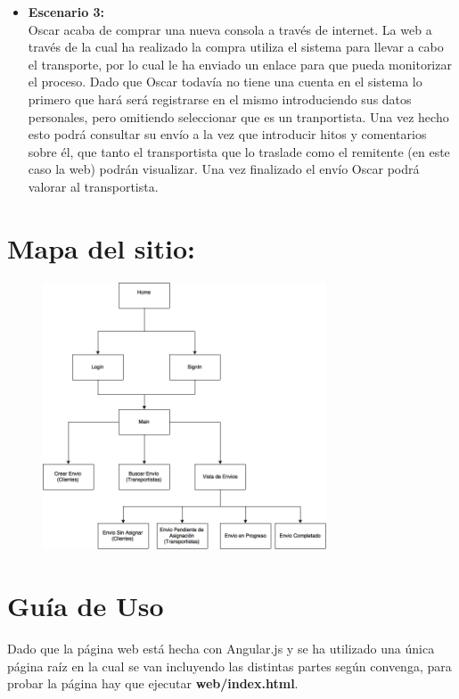 \documentclass[10pt, a4paper,spanish]{article}
\begin{document}
\begin{itemize}
			\item \textbf{Escenario 3:} \\
				Oscar acaba de comprar una nueva consola a través de internet. La web a través de la cual ha realizado la compra utiliza el sistema para llevar a cabo el transporte, por lo cual le ha enviado un enlace para que pueda monitorizar el proceso. Dado que Oscar todavía no tiene una cuenta en el sistema lo primero que hará será registrarse en el mismo introduciendo sus datos personales, pero omitiendo seleccionar que es un tranportista. Una vez hecho esto podrá consultar su envío a la vez que introducir hitos y comentarios sobre él, que tanto el transportista que lo traslade como el remitente (en este caso la web) podrán visualizar. Una vez finalizado el envío Oscar podrá valorar al transportista.

		\end{itemize}


	\section{Mapa del sitio:}


		\begin{figure}[H]
			\centering
				\includegraphics[width=0.75\textwidth]{res/sitemap.png}
		\end{figure}

	\section{Guía de Uso}

		\paragraph{}
		Dado que la página web está hecha con Angular.js y se ha utilizado una única página raíz en la cual se van incluyendo las distintas partes según convenga, para probar la página hay que ejecutar \textbf{web/index.html}.
\end{document}
